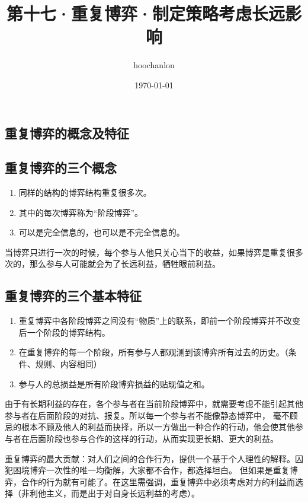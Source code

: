 \documentclass[12pt, a4paper]{article}
\title{第十七·重复博弈·制定策略考虑长远影响}
\author{hoochanlon}
\date{\today}
\begin{document}
	\begin{CJK*}{UTF8}{gbsn}
		\maketitle
        \clearpage
        \section{重复博弈的概念及特征}
        \subsection{重复博弈的三个概念}
        \begin{enumerate}
            \item 同样的结构的博弈结构重复很多次。
            \item 其中的每次博弈称为“阶段博弈”。
            \item 可以是完全信息的，也可以是不完全信息的。
        \end{enumerate}
        当博弈只进行一次的时候，每个参与人他只关心当下的收益，如果博弈是重复很多次的，那么参与人可能就会为了长远利益，牺牲眼前利益。
        \subsection{重复博弈的三个基本特征}
        \begin{enumerate}
            \item 重复博弈中各阶段博弈之间没有“物质”上的联系，即前一个阶段博弈并不改变后一个阶段的博弈结构。
            \item 在重复博弈的每一个阶段，所有参与人都观测到该博弈所有过去的历史。（条件、规则、内容相同）
            \item 参与人的总损益是所有阶段博弈损益的贴现值之和。
        \end{enumerate}
        由于有长期利益的存在，各个参与者在当前阶段博弈中，就需要考虑不能引起其他参与者在后面阶段的对抗、报复。所以每一个参与者不能像静态博弈中，
        毫不顾忌的根本不顾及他人的利益而抉择，所以一方做出一种合作的行动，他会使其他参与者在后面阶段也参与合作的这样的行动，从而实现更长期、更大的利益。 \par

        重复博弈的最大贡献：对人们之间的合作行为，提供一个基于个人理性的解释。囚犯困境博弈一次性的唯一均衡解，大家都不合作，都选择坦白。
        但如果是重复博弈，合作的行为就有可能了。在这里需强调，重复博弈中必须考虑对方的利益而选择（非利他主义，而是出于对自身长远利益的考虑）。


\end{CJK*}
\end{document}
